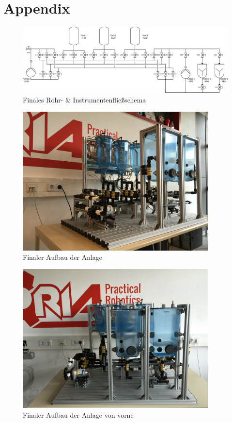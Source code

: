 \chapter{Appendix}
	
	\begin{figure}[h!]
  		\centering
      	\includegraphics[width=1\textwidth]{graphics/implementation/RI_Impl_farblos}
  		\caption{Finales Rohr- \& Instrumentenfließschema}
	\end{figure}	
	
	\begin{figure}[h!]
  		\centering
      	\includegraphics[width=0.9\textwidth]{graphics/implementation/FinalerAufbau2}
  		\caption{Finaler Aufbau der Anlage}
	\end{figure}	
	
	\begin{figure}[h!]
  		\centering
      	\includegraphics[width=0.9\textwidth]{graphics/implementation/FinalerAufbau3}
  		\caption{Finaler Aufbau der Anlage von vorne}
	\end{figure}	